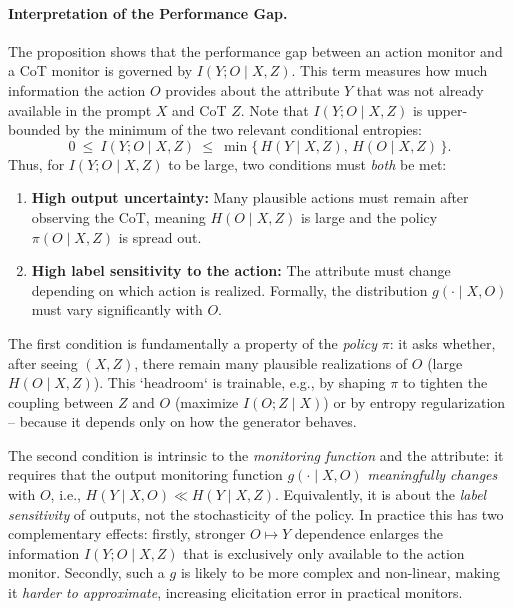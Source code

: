 \documentclass{article}
\theoremstyle{plain}
\begin{document}
\paragraph{Interpretation of the Performance Gap.}
The proposition shows that the performance gap between an action monitor and a CoT monitor is governed by $I(Y;O\mid X,Z)$.
This term measures how much information the action $O$ provides about the attribute $Y$ that was not already available in the prompt $X$ and CoT $Z$.
Note that $I(Y;O\mid X,Z)$ is upper-bounded by the minimum of the two relevant conditional entropies:
\[
0\ \le\ I(Y;O\mid X,Z)\ \le\ \min\{\,H(Y\mid X,Z),\,H(O\mid X,Z)\,\}.
\]
Thus, for $I(Y;O\mid X,Z)$ to be large, two conditions must \emph{both} be met:
\begin{enumerate}
    \item \textbf{High output uncertainty:} Many plausible actions must remain after observing the CoT, meaning $H(O\mid X,Z)$ is large and the policy $\pi(O\mid X,Z)$ is spread out.
    \item \textbf{High label sensitivity to the action:} The attribute must change depending on which action is realized. Formally, the distribution $g(\cdot\mid X,O)$ must vary significantly with $O$.
\end{enumerate}

The first condition is fundamentally a property of the \emph{policy} $\pi$: it asks whether, after seeing $(X,Z)$, there remain many plausible realizations of $O$ (large $H(O\mid X,Z)$).
This `headroom` is trainable, e.g., by shaping $\pi$ to tighten the coupling between $Z$ and $O$ (maximize $I(O;Z\mid X)$) or by entropy regularization -- because it depends only on how the generator behaves.

The second condition is intrinsic to the \emph{monitoring function} and the attribute: it requires that the output monitoring function $g(\cdot\mid X,O)$ \emph{meaningfully changes} with $O$, i.e., $H(Y\mid X,O)\!\ll\!H(Y\mid X,Z)$.
Equivalently, it is about the \emph{label sensitivity} of outputs, not the stochasticity of the policy.
In practice this has two complementary effects:
firstly, stronger $O\!\mapsto\!Y$ dependence enlarges the information $I(Y;O\mid X,Z)$ that is exclusively only available to the action monitor.
Secondly, such a $g$ is likely to be more complex and non-linear, making it \emph{harder to approximate}, increasing elicitation error in practical monitors.
\end{document}
